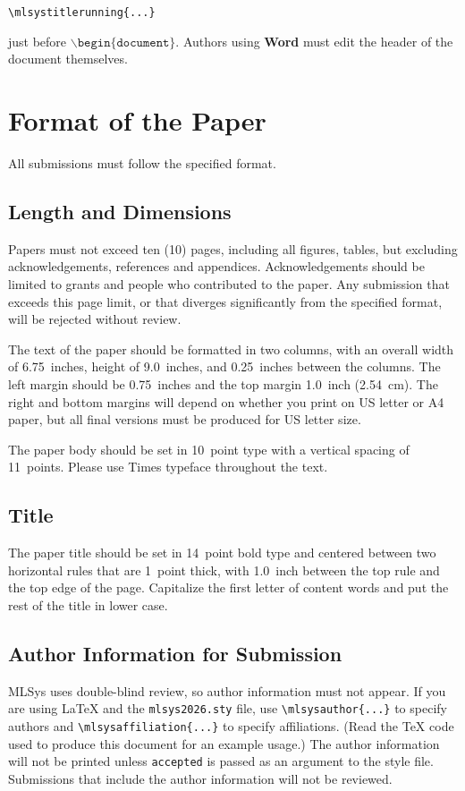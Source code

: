 \documentclass{article}
\begin{document}
\verb|\mlsystitlerunning{...}|

just before $\mathtt{\backslash begin\{document\}}$.
Authors using \textbf{Word} must edit the header of the document themselves.

\section{Format of the Paper}

All submissions must follow the specified format.

\subsection{Length and Dimensions}

Papers must not exceed ten (10) pages, including all figures, tables,
but excluding acknowledgements, references and appendices.
Acknowledgements should be limited to grants and people who contributed to the paper.
Any submission that exceeds
this page limit, or that diverges significantly from the specified format,
will be rejected without review.

The text of the paper should be formatted in two columns, with an
overall width of 6.75~inches, height of 9.0~inches, and 0.25~inches
between the columns. The left margin should be 0.75~inches and the top
margin 1.0~inch (2.54~cm). The right and bottom margins will depend on
whether you print on US letter or A4 paper, but all final versions
must be produced for US letter size.

The paper body should be set in 10~point type with a vertical spacing
of 11~points. Please use Times typeface throughout the text.

\subsection{Title}

The paper title should be set in 14~point bold type and centered
between two horizontal rules that are 1~point thick, with 1.0~inch
between the top rule and the top edge of the page. Capitalize the
first letter of content words and put the rest of the title in lower
case.

\subsection{Author Information for Submission}
\label{author info}

MLSys uses double-blind review, so author information must not appear. If
you are using \LaTeX\/ and the \texttt{mlsys2026.sty} file, use
\verb+\mlsysauthor{...}+ to specify authors and \verb+\mlsysaffiliation{...}+ to specify affiliations. (Read the TeX code used to produce this document for an example usage.) The author information
will not be printed unless \texttt{accepted} is passed as an argument to the
style file.
Submissions that include the author information will not
be reviewed.
\end{document}
